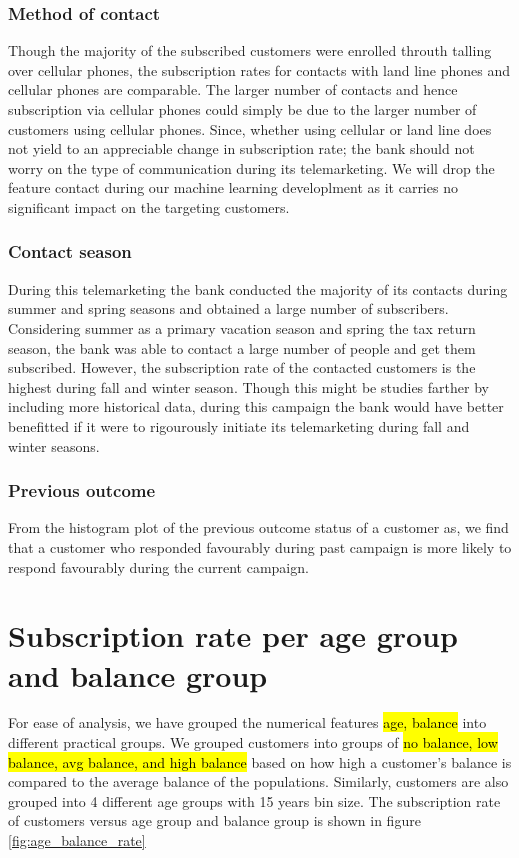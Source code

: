 \subsubsection*{Method of contact}
Though the majority of the subscribed customers were enrolled throuth talling over cellular phones, the subscription rates for contacts with land line phones and cellular phones are comparable. The larger number of contacts and hence subscription via cellular phones could simply be due to the larger number of customers using cellular phones. Since, whether using cellular or land line does not yield to an appreciable change in subscription rate; the bank should not worry on the type of communication during its telemarketing. We will drop the feature contact during our machine learning developlment as it carries no significant impact on the targeting customers.

\subsubsection*{Contact season}
During this telemarketing the bank conducted the majority of its contacts during summer and spring seasons and obtained a large number of subscribers. Considering summer as a primary vacation season and spring the tax return season, the bank was able to contact a large number of people and get them subscribed. However, the subscription rate of the contacted customers is the highest during fall and winter season. Though this might be studies farther by including more historical data, during this campaign the bank would have better benefitted if it were to rigourously initiate its telemarketing during fall and winter seasons.

\subsubsection*{Previous outcome}
From the histogram plot of the previous outcome status of a customer as, we find that a customer who responded favourably during past campaign is more likely to respond favourably during the current campaign.

\section{Subscription rate per age group and balance group}
For ease of analysis, we have grouped the numerical features \hl{age, balance} into different practical groups. We grouped customers into groups of \hl{no balance, low balance, avg balance, and high balance} based on how high a customer's balance is compared to the average balance of the populations. Similarly, customers are also grouped into 4 different age groups with 15 years bin size. The subscription rate of customers versus age group and balance group is shown in figure \ref{fig:age_balance_rate}

